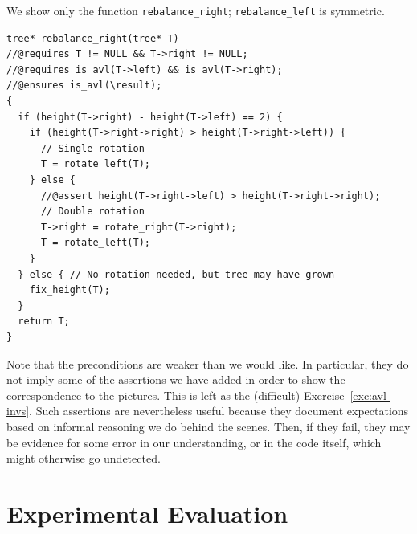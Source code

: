 \newpage
We show only the function \lstinline'rebalance_right';
\lstinline'rebalance_left' is symmetric.
\begin{lstlisting}[language={[C0]C}]
tree* rebalance_right(tree* T)
//@requires T != NULL && T->right != NULL;
//@requires is_avl(T->left) && is_avl(T->right);
//@ensures is_avl(\result);
{
  if (height(T->right) - height(T->left) == 2) {
    if (height(T->right->right) > height(T->right->left)) {
      // Single rotation
      T = rotate_left(T);
    } else {
      //@assert height(T->right->left) > height(T->right->right);
      // Double rotation
      T->right = rotate_right(T->right);
      T = rotate_left(T);
    }
  } else { // No rotation needed, but tree may have grown
    fix_height(T);
  }
  return T;
}
\end{lstlisting}

Note that the preconditions are weaker than we would like.  In
particular, they do not imply some of the assertions we have added in
order to show the correspondence to the pictures.  This is left as the
(difficult) Exercise~\ref{exc:avl-invs}.  Such assertions are nevertheless
useful because they document expectations based on informal reasoning
we do behind the scenes.  Then, if they fail, they may be evidence
for some error in our understanding, or in the code itself, which
might otherwise go undetected.


\section{Experimental Evaluation}
\label{sec:avl:exp_eval}

